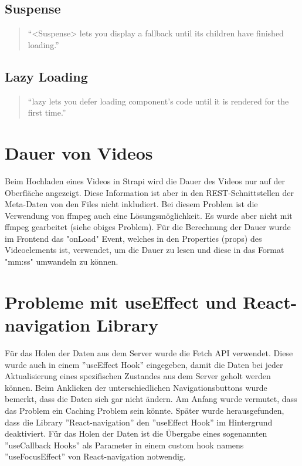 \begin{spacing}{1}
    \subsection{Suspense}\label{subsec:suspense}

    \begin{quotation}

        ``<Suspense> lets you display a fallback until its children have finished
        loading.''~\cite{suspense}
    \end{quotation}

    \subsection{Lazy Loading}\label{subsec:lazy-loading}

    \begin{quotation}
        ``lazy lets you defer loading component’s code until it is rendered for
        the first time.''~\cite{lazyLoading}
    \end{quotation}


    \section{Dauer von Videos}\label{sec:dauer-von-videos}

    Beim Hochladen eines Videos in Strapi
    wird die Dauer des Videos nur auf der Oberfläche angezeigt.
    Diese Information ist aber in den REST-Schnittstellen der Meta-Daten von den Files nicht inkludiert.
    Bei diesem Problem ist die Verwendung von ffmpeg auch eine Lösungsmöglichkeit.
    Es wurde aber nicht mit ffmpeg gearbeitet (siehe obiges Problem).
    Für die Berechnung der Dauer wurde im Frontend das "onLoad" Event,
    welches in den Properties (props) des Videoelements ist, verwendet,
    um die Dauer zu lesen und diese in das Format "mm:ss" umwandeln zu können.





    \section{Probleme mit useEffect und React-navigation Library}\label{sec:probleme-mit-useeffect-und-react-navigation-library}
    Für das Holen der Daten aus dem Server wurde die Fetch API verwendet.
    Diese wurde auch in einem ''useEffect Hook'' eingegeben, damit die Daten bei jeder Aktualisierung eines spezifischen
    Zustandes aus dem Server geholt werden können.
    Beim Anklicken der unterschiedlichen Navigationsbuttons wurde bemerkt,
    dass die Daten sich gar nicht ändern.
    Am Anfang wurde vermutet, dass das Problem ein Caching Problem sein könnte.
    Später wurde herausgefunden, dass die Library ''React-navigation'' den ''useEffect Hook'' im Hintergrund deaktiviert.
    Für das Holen der Daten ist die Übergabe eines sogenannten 
    ''useCallback Hooks'' als Parameter in einem custom hook namens ''useFocusEffect''
    von React-navigation notwendig.\cite{issuesWithUseEffect}



\end{spacing}
